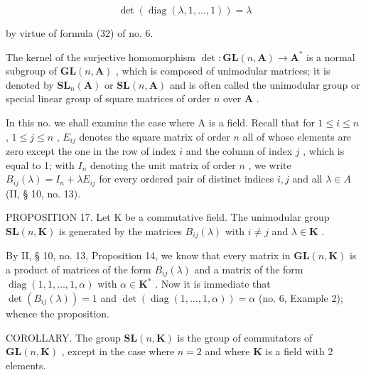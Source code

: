 \[
\det (\operatorname{diag} (\lambda , 1, \dots , 1)) = \lambda
\]

by virtue of formula (32) of no. 6.

The kernel of the surjective homomorphism \(\operatorname{det}:\mathbf{GL}(n,\mathbf{A})\to \mathbf{A}^*\) is a normal subgroup of \(\mathbf{GL}(n,\mathbf{A})\) , which is composed of unimodular matrices; it is denoted by \(\mathbf{SL}_n(\mathbf{A})\) or \(\mathbf{SL}(n,\mathbf{A})\) and is often called the unimodular group or special linear group of square matrices of order \(n\) over \(\mathbf{A}\) .

In this no. we shall examine the case where A is a field. Recall that for \(1 \leqslant i \leqslant n\) , \(1 \leqslant j \leqslant n\) , \(E_{ij}\) denotes the square matrix of order \(n\) all of whose elements are zero except the one in the row of index \(i\) and the column of index \(j\) , which is equal to 1; with \(I_n\) denoting the unit matrix of order \(n\) , we write \(B_{ij}(\lambda) = I_n + \lambda E_{ij}\) for every ordered pair of distinct indices \(i, j\) and all \(\lambda \in A\) (II, § 10, no. 13).

PROPOSITION 17. Let K be a commutative field. The unimodular group \(\mathbf{SL}(n, \mathbf{K})\) is generated by the matrices \(B_{ij}(\lambda)\) with \(i \neq j\) and \(\lambda \in \mathbf{K}\) .

By II, § 10, no. 13, Proposition 14, we know that every matrix in \(\mathbf{GL}(n,\mathbf{K})\) is a product of matrices of the form \(B_{ij}(\lambda)\) and a matrix of the form \(\operatorname{diag}(1,1,\ldots,1,\alpha)\) with \(\alpha\in\mathbf{K}^{*}\) . Now it is immediate that \(\det(B_{ij}(\lambda))=1\) and \(\det(\operatorname{diag}(1,\ldots,1,\alpha))=\alpha\) (no. 6, Example 2); whence the proposition.

COROLLARY. The group \(\mathbf{SL}(n, \mathbf{K})\) is the group of commutators of \(\mathbf{GL}(n, \mathbf{K})\) , except in the case where \(n = 2\) and where \(\mathbf{K}\) is a field with 2 elements.


